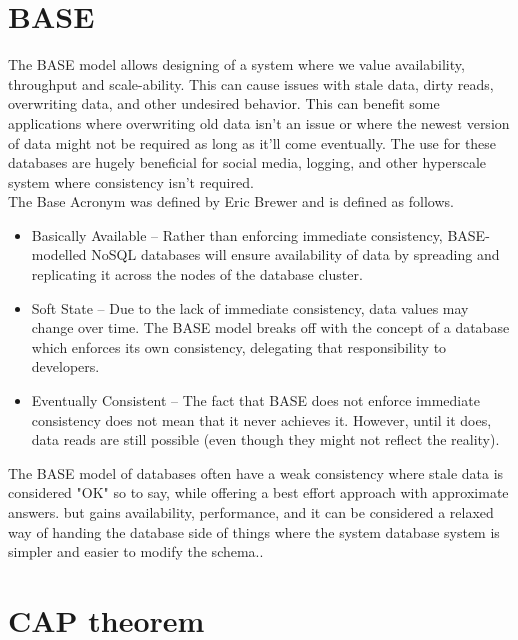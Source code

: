 \documentclass[a4paper,10pt,titlepage]{report}
\begin{document}
\section{BASE}
The BASE model allows designing of a system where we value availability, throughput and scale-ability. This can cause issues with stale data, dirty reads, overwriting data, and other undesired behavior. This can benefit some applications where overwriting old data isn't an issue or where the newest version of data might not be required as long as it'll come eventually. The use for these databases are hugely beneficial for social media, logging, and other hyperscale system where consistency isn't required.\\
\vspace{5mm}
The Base Acronym was defined by Eric Brewer\cite{brewer2000towards} and is defined as follows.

\begin{itemize}
    \item Basically Available – Rather than enforcing immediate consistency, BASE-modelled NoSQL databases will ensure availability of data by spreading and replicating it across the nodes of the database cluster.
    \item Soft State – Due to the lack of immediate consistency, data values may change over time. The BASE model breaks off with the concept of a database which enforces its own consistency, delegating that responsibility to developers.
    \item Eventually Consistent – The fact that BASE does not enforce immediate consistency does not mean that it never achieves it. However, until it does, data reads are still possible (even though they might not reflect the reality).
\end{itemize}

The BASE model of databases often have a weak consistency where stale data is considered "OK" so to say, while offering a best effort approach with approximate answers. but gains availability, performance, and it can be considered a relaxed way of handing the database side of things where the system database system is simpler and easier to modify the schema..

\section{CAP theorem}
\end{document}
